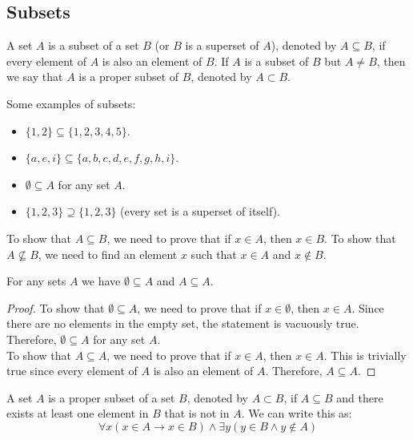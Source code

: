\subsection{Subsets}
\begin{definition}[Subset]
    A set $A$ is a subset of a set $B$ (or $B$ is a superset of $A$), denoted by $A \subseteq B$, if every element of $A$ is also an element of $B$. If $A$ is a subset of $B$ but $A \neq B$, then we say that $A$ is a proper subset of $B$, denoted by $A \subset B$.
\end{definition}
\begin{eg}
    Some examples of subsets:
    \begin{itemize}[itemsep=1pt,label=$\circ$]
        \item $\{1, 2\} \subseteq \{1, 2, 3, 4, 5\}$.
        \item $\{a, e, i\} \subseteq \{a, b, c, d, e, f, g, h, i\}$.
        \item $\emptyset \subseteq A$ for any set $A$.
        \item $\{1, 2, 3\} \supseteq \{1, 2, 3\}$ (every set is a superset of itself).
    \end{itemize}
\end{eg}
To show that $A \subseteq B$, we need to prove that if $x \in A$, then $x \in B$. To show that $A \not\subseteq B$, we need to find an element $x$ such that $x \in A$ and $x \notin B$.
\begin{theorem}
    For any sets $A$ we have $\emptyset \subseteq A$ and $A \subseteq A$.
\end{theorem}
\begin{proof}
    To show that $\emptyset \subseteq A$, we need to prove that if $x \in \emptyset$, then $x \in A$. Since there are no elements in the empty set, the statement is vacuously true. Therefore, $\emptyset \subseteq A$ for any set $A$. \\
    To show that $A \subseteq A$, we need to prove that if $x \in A$, then $x \in A$. This is trivially true since every element of $A$ is also an element of $A$. Therefore, $A \subseteq A$.
\end{proof}

\begin{definition}
    A set $A$ is a proper subset of a set $B$, denoted by $A \subset B$, if $A \subseteq B$ and there exists at least one element in $B$ that is not in $A$. We can write this as:
    \[ \forall x(x \in A \to x \in B) \land \exists y(y \in B \land y \notin A) \]
\end{definition}

